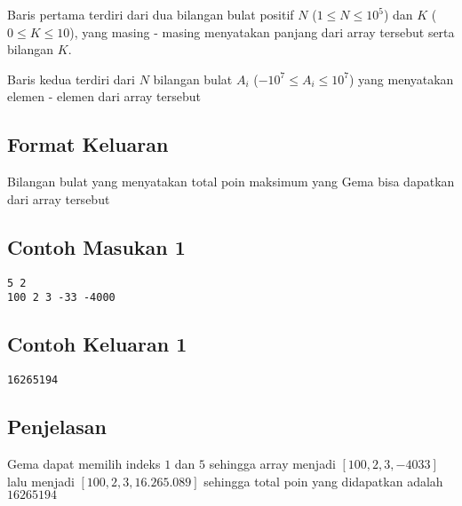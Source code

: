 \documentclass{article}
\begin{document}
Baris pertama terdiri dari dua bilangan bulat positif $N$ ($1 \leq N \leq 10^{5}$) dan $K$ ($0 \leq K \leq 10$), yang masing - masing menyatakan panjang dari array tersebut serta bilangan $K$.

Baris kedua terdiri dari $N$ bilangan bulat $A_{i}$ ($-10^7 \leq A_{i} \leq 10^7$) yang menyatakan elemen - elemen dari array tersebut

\subsection*{Format Keluaran}

Bilangan bulat yang menyatakan total poin maksimum yang Gema bisa dapatkan dari array tersebut

\begin{multicols}{2}
\subsection*{Contoh Masukan 1}
\begin{lstlisting}
5 2
100 2 3 -33 -4000 
\end{lstlisting}
\columnbreak
\subsection*{Contoh Keluaran 1}
\begin{lstlisting}
16265194
\end{lstlisting}
\vfill
\null
\end{multicols}


\subsection*{Penjelasan}

Gema dapat memilih indeks $1$ dan $5$ sehingga array menjadi $[100,2,3,-4033]$ lalu menjadi $[100,2,3,16.265.089]$ sehingga total poin yang didapatkan adalah $16265194$  
\end{document}
